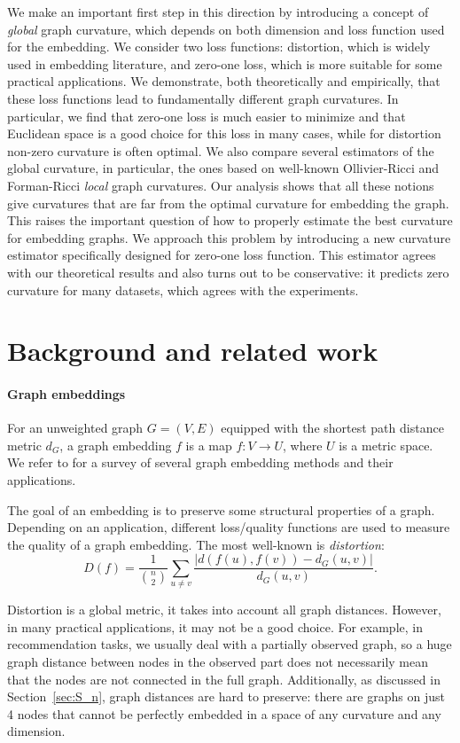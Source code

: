 \documentclass{article} %
\begin{document}
We make an important first step in this direction by introducing a concept of \textit{global} graph curvature, which depends on both dimension and loss function used for the embedding. We consider two loss functions: distortion, which is widely used in embedding literature, and zero-one loss, which is more suitable for some practical applications. We demonstrate, both theoretically and empirically, that these loss functions lead to fundamentally different graph curvatures. 
In particular, we find that zero-one loss is much easier to minimize and that Euclidean space is a good choice for this loss in many cases, while for distortion non-zero curvature is often optimal.
We also compare several estimators of the global curvature, in particular, the ones based on well-known Ollivier-Ricci and Forman-Ricci \textit{local} graph curvatures. Our analysis shows that all these notions give curvatures that are far from the optimal curvature for embedding the graph. This raises the important question of how to properly estimate the best curvature for embedding graphs. 
We approach this problem by introducing a new curvature estimator specifically designed for zero-one loss function. This estimator agrees with our theoretical results and also turns out to be conservative: it predicts zero curvature for many datasets, which agrees with the experiments.

\section{Background and related work}\label{sec:related_work}

\paragraph{Graph embeddings} 
For an unweighted graph $G = (V,E)$ equipped with the shortest path distance metric $d_G$, a graph embedding $f$ is a map $f: V \rightarrow U$, where $U$ is a metric space.
We refer to \cite{goyal2018graph} for a survey of several graph embedding methods and their applications. 

The goal of an embedding is to preserve some structural properties of a graph.
Depending on an application, different loss/quality functions are used to measure the quality of a graph embedding. The most well-known is \textit{distortion}:
\[
D(f) = \frac{1}{\binom{n}{2}} \sum_{u \neq v}  \frac{|d(f(u),f(v)) - d_G(u,v)|}{d_G(u,v)}.
\]

Distortion is a global metric, it takes into account all graph distances. However, in many practical applications, it may not be a good choice. For example, in recommendation tasks, we usually deal with a partially observed graph, so a huge graph distance between nodes in the observed part does not necessarily mean that the nodes are not connected in the full graph. Additionally, as discussed in Section~\ref{sec:S_n}, graph distances are hard to preserve: there are graphs on just 4 nodes that cannot be perfectly embedded in a space of any curvature and any dimension. 
\end{document}
